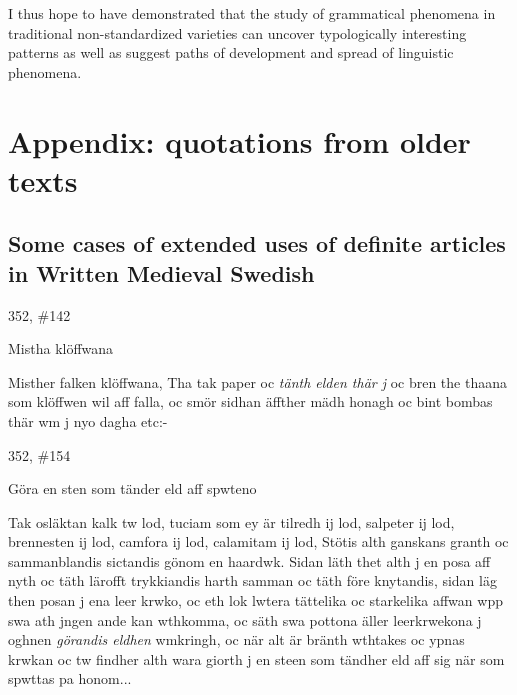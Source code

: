 \begin{styleBodytextC}
I thus hope to have demonstrated that the study of grammatical phenomena in traditional non-standardized varieties can uncover typologically interesting patterns as well as suggest paths of development and spread of linguistic phenomena. 

\end{styleBodytextC}

\chapter[Appendix: quotations from older texts]{\rmfamily\bfseries Appendix: quotations from older texts}
\section{\rmfamily\bfseries Some cases of extended uses of definite articles in Written Medieval Swedish}

\begin{styleBlockQuote}
352, \#142

\end{styleBlockQuote}

\begin{styleBlockQuote}
Mistha klöffwana

\end{styleBlockQuote}

\begin{styleBodyTextFirst}
Misther falken klöffwana, Tha tak paper oc \textit{tänth elden thär j} oc bren the thaana som klöffwen wil aff falla, oc smör sidhan äffther mädh honagh oc bint bombas thär wm j nyo dagha etc:-

\end{styleBodyTextFirst}

\begin{styleBlockQuote}
352, \#154

\end{styleBlockQuote}

\begin{styleBlockQuoteHeading}
Göra en sten som tänder eld aff spwteno 

\end{styleBlockQuoteHeading}

\begin{styleBodyTextFirst}
Tak osläktan kalk tw lod, tuciam som ey är tilredh ij lod, salpeter ij lod, brennesten ij lod, camfora ij lod, calamitam ij lod, Stötis alth ganskans granth oc sammanblandis sictandis gönom en haardwk. Sidan läth thet alth j en posa aff nyth oc täth lärofft trykkiandis harth samman oc täth före knytandis, sidan läg then posan j ena leer krwko, oc eth lok lwtera tättelika oc starkelika affwan wpp swa ath jngen ande kan wthkomma, oc säth swa pottona äller leerkrwekona j oghnen \textit{görandis eldhen} wmkringh, oc när alt är bränth wthtakes oc ypnas krwkan oc tw findher alth wara giorth j en steen som tändher eld aff sig när som spwttas pa honom...

\end{styleBodyTextFirst}

